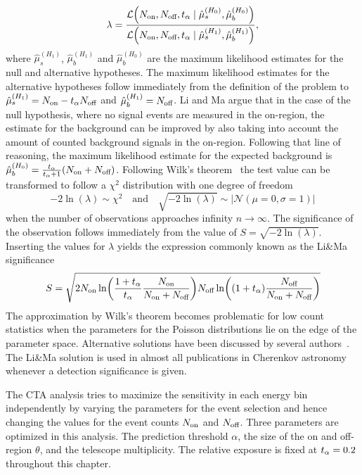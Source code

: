 \begin{equation*}
    \lambda = \frac{\operatorname{\mathcal{L}} \left( \Non, \Noff, \talpha \mid {\hat{\mu}^{(H_0)}_s}, {\hat{\mu}^{(H_0)}_b} \right)}{\operatorname{\mathcal{L}} \left( \Non, \Noff, \talpha \mid {\hat{\mu}^{(H_1)}_s}, {\hat{\mu}^{(H_1)}_b} \right)},
\end{equation*}
where ${\hat{\mu}^{(H_1)}_s}$, ${\hat{\mu}^{(H_1)}_b}$ and ${\hat{\mu}^{(H_0)}_b}$ are the maximum likelihood estimates for the null and alternative hypotheses.
The maximum likelihood estimates for the alternative hypotheses follow immediately from the definition of the problem to 
${\hat{\mu}}^{(H_1)}_s = N_\text{on} - t_{\alpha} N_\text{off}$ and ${\hat{\mu}}^{(H_1)}_b = N_\text{off}$.
Li and Ma argue that in the case of the null hypothesis, where no signal events are measured in the on-region, the estimate for the background can be 
improved by also taking into account the amount of counted background signals in the on-region. Following that line of reasoning, the 
maximum likelihood estimate for the expected background is ${\hat{\mu}}^{(H_0)}_b = \frac{t_{\alpha}}{t_{\alpha} + 1} (N_\text{on} + N_\text{off})$.
Following Wilk's theorem~\cite{wilk} the test value can be transformed to follow a $\chi^2$ distribution with one degree of freedom 
\begin{equation*}
    -2 \ln (\lambda) \sim \chi^2 \quad \text{and} \quad \sqrt{-2 \ln (\lambda)} \sim |\mathcal{N}(\mu=0, \sigma=1)|
\end{equation*}
when the number of observations approaches infinity $n \rightarrow \infty$.
The significance of the observation follows immediately from the value of $S = \sqrt{-2 \ln (\lambda)}$.
Inserting the values for $\lambda$ yields the expression commonly known as the Li\&Ma significance~\cite[eq. 17]{lima} 
\begin{equation*}
    \label{eq:lima}
    S =  \sqrt{ 2 \Non \ln\left( \frac{1 + \talpha}{\talpha} \frac{\Non}{\Non + \Noff} \right) \Noff \ln\left( (1 + \talpha) \frac{\Noff}{\Non + \Noff} \right)}
\end{equation*}
The approximation by Wilk's theorem becomes problematic for low count statistics when the parameters for the Poisson distributions lie on the edge of the 
parameter space. Alternative solutions have been discussed by several authors~\cite{lima_ahnen,lima_casadei,lima_dalibor}. 
The Li\&Ma solution is used in almost all publications in Cherenkov astronomy whenever a detection significance is given.

The CTA analysis tries to maximize the sensitivity in each energy bin independently by varying the parameters for the event selection
and hence changing the values for the event counts $N_\text{on}$ and $N_\text{off}$. Three parameters are optimized in this analysis. 
The prediction threshold $\alpha$, the size of the on and off-region $\theta$, and the telescope multiplicity. 
The relative exposure is fixed at $t_{\alpha} = 0.2$ throughout this chapter.

